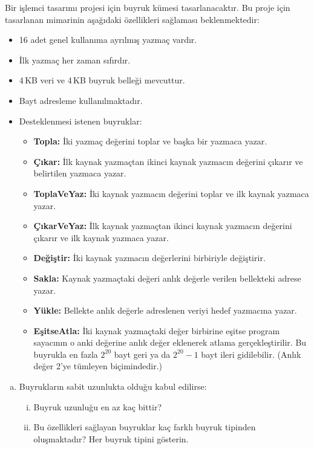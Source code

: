 \begin{alistirma}[\zor]
Bir işlemci tasarımı projesi için buyruk kümesi tasarlanacaktır. Bu proje için tasarlanan mimarinin aşağıdaki özellikleri sağlaması beklenmektedir:
\begin{itemize}
    \item 16 adet genel kullanıma ayrılmış yazmaç vardır.
    \item İlk yazmaç her zaman sıfırdır.
    \item 4\,KB veri ve 4\,KB buyruk belleği mevcuttur.
    \item Bayt adresleme kullanılmaktadır.
    \item Desteklenmesi istenen buyruklar:
    \begin{itemize}
        \item \textbf{Topla:} İki yazmaç değerini toplar ve başka bir yazmaca yazar.
        \item \textbf{Çıkar:} İlk kaynak yazmaçtan ikinci kaynak yazmacın değerini çıkarır ve belirtilen yazmaca yazar.
        \item \textbf{ToplaVeYaz:} İki kaynak yazmacın değerini toplar ve ilk kaynak yazmaca yazar.
        \item \textbf{ÇıkarVeYaz:} İlk kaynak yazmaçtan ikinci kaynak yazmacın değerini çıkarır ve ilk kaynak yazmaca yazar.
        \item \textbf{Değiştir:} İki kaynak yazmacın değerlerini birbiriyle değiştirir.
        \item \textbf{Sakla:} Kaynak yazmaçtaki değeri anlık değerle verilen bellekteki adrese yazar.
        \item \textbf{Yükle:} Bellekte anlık değerle adreslenen veriyi hedef yazmacına yazar.
        \item \textbf{EşitseAtla:} İki kaynak yazmaçtaki değer birbirine eşitse program sayacının o anki değerine anlık değer eklenerek atlama gerçekleştirilir. Bu buyrukla en fazla $2^{20}$ bayt geri ya da $2^{20}-1$ bayt ileri gidilebilir. (Anlık değer 2'ye tümleyen biçimindedir.)
    \end{itemize}
\end{itemize}
\begin{enumerate}[(a)]
    \item Buyrukların sabit uzunlukta olduğu kabul edilirse:
    \begin{enumerate}[(i)]
        \item Buyruk uzunluğu en az kaç bittir?
        \item Bu özellikleri sağlayan buyruklar kaç farklı buyruk tipinden oluşmaktadır? Her buyruk tipini gösterin.

\end{enumerate}
\end{enumerate}
\end{alistirma}

